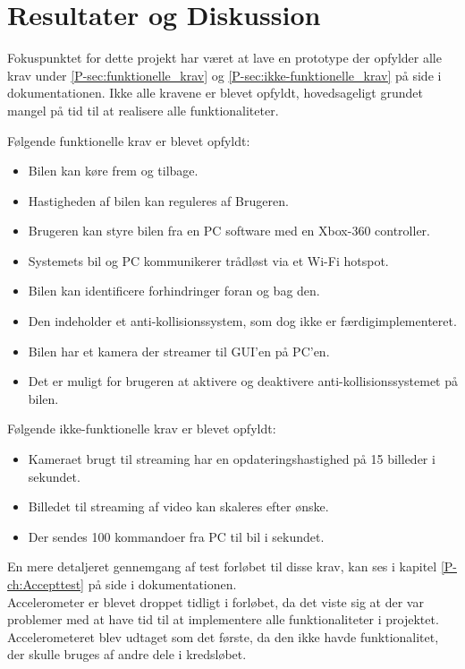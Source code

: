 \chapter{Resultater og Diskussion} \label{ch:Resultater_og_diskussion}

Fokuspunktet for dette projekt har været at lave en prototype der opfylder alle krav under \ref{P-sec:funktionelle_krav}  og \ref{P-sec:ikke-funktionelle_krav}  på side \pageref{P-sec:funktionelle_krav} i dokumentationen. 
Ikke alle kravene er blevet opfyldt, hovedsageligt grundet mangel på tid til at realisere alle funktionaliteter.

Følgende funktionelle krav er blevet opfyldt:
\begin{itemize}
	\item Bilen kan køre frem og tilbage. 
	\item Hastigheden af bilen kan reguleres af Brugeren. 
	\item Brugeren kan styre bilen fra en PC software med en Xbox-360 controller. 			\item Systemets bil og PC kommunikerer trådløst via et Wi-Fi hotspot.
	\item Bilen kan identificere forhindringer foran og bag den. 
	\item Den indeholder et anti-kollisionssystem, som dog ikke er færdigimplementeret. 
	\item Bilen har et kamera der streamer til GUI'en på PC'en. 
	\item Det er muligt for brugeren at aktivere og deaktivere anti-kollisionssystemet på bilen.
\end{itemize}

Følgende ikke-funktionelle krav er blevet opfyldt: 
\begin{itemize}
	\item Kameraet brugt til streaming har en opdateringshastighed på 15 billeder i sekundet. 
	\item Billedet til streaming af video kan skaleres efter ønske. 
	\item Der sendes 100 kommandoer fra PC til bil i sekundet.
\end{itemize}

En mere detaljeret gennemgang af test forløbet til disse krav, kan ses i kapitel \ref{P-ch:Accepttest}  på side \pageref{P-ch:Accepttest} i dokumentationen.\\

Accelerometer er blevet droppet tidligt i forløbet, da det viste sig at der var problemer med at have tid til at implementere alle funktionaliteter i projektet. Accelerometeret blev udtaget som det første, da den ikke havde funktionalitet, der skulle bruges af andre dele i kredsløbet.

